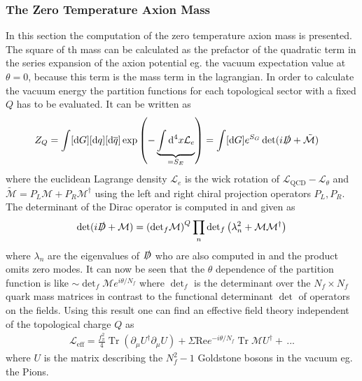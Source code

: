 \documentclass[a4paper, 12pt]{article}
\newcommand{\diff}{\mathrm{d}}
\DeclareMathOperator{\trace}{Tr}
\begin{document}
\subsubsection{The Zero Temperature Axion Mass}
\label{sec:axion_mass}
In this section the computation of the zero temperature axion mass is presented.
The square of th mass can be calculated as the prefactor of the quadratic term in the series expansion of the axion potential eg. the vacuum expectation value at $\theta = 0$, because this term is the mass term in the lagrangian.
In order to calculate the vacuum energy the partition functions for each topological sector with a fixed $Q$ has to be evaluated.
It can be written as
\begin{align*}
    Z_Q &= \int [\diff G] [\diff q] [\diff \overline{q}] \exp \left( - \underbrace{\int \diff^4 x \mathcal{L}_e}_{= S_E} \right)
     = \int [\diff G] e^{S_G} \det (i \slashed{D} + \tilde{\mathcal{M}})
\end{align*}
where the euclidean Lagrange density $\mathcal{L}_e$ is the wick rotation of $\mathcal{L}_\mathrm{QCD} - \mathcal{L}_\theta$
\cite[Sec. II, Eq. 2.8, 2.9]{Leutwyler:1992yt} and $\tilde{\mathcal{M}} = P_L \mathcal{M} + P_R \mathcal{M}^\dagger $ using the left and right chiral
projection operators $P_L, P_R$.
The determinant of the Dirac operator is computed in \cite[Sec. II, Eq. 2.9]{Leutwyler:1992yt} and given as
\begin{align*}
    \det (i \slashed{D} + \mathcal{M}) = \left( \mathrm{det}_f \mathcal{M} \right)^Q \prod_n \mathrm{det}_f \left( \lambda_n^2 + \mathcal{M} \mathcal{M}^\dagger \right)
\end{align*}
where $\lambda_n$ are the eigenvalues of $\slashed{D}$ who are also computed in \cite{Leutwyler:1992yt}
and the product omits zero modes.
It can now be seen that the $\theta$ dependence of the partition function
is like $\sim \det_f \mathcal{M} e^{i \theta / N_f}$
where $\det_f$ is the determinant over the $N_f \times N_f$ quark mass matrices
in contrast to the functional determinant $\det$ of operators on the fields.
Using this result one can find an effective field theory independent of the
topological charge $Q$ as \cite[Sec. VIII, Eq 8.4]{Leutwyler:1992yt}
\begin{align}
    \label{eq:L_eff}
    \mathcal{L}_\mathrm{eff} = \frac{f_\pi^2}{4} \trace ( \partial_\mu U^\dagger \partial_\mu U) + \Sigma \mathrm{Re} e^{-i \theta / N_f} \trace \mathcal{M} U^\dagger + \, ...
\end{align}
where $U$ is the matrix describing the $N_f^2 - 1$ Goldstone bosons in the vacuum eg. the Pions.
\end{document}
